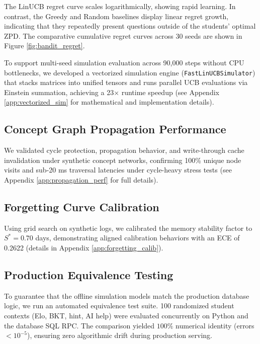 \documentclass{article}
\begin{document}
The LinUCB regret curve scales logarithmically, showing rapid learning. In contrast, the Greedy and Random baselines display linear regret growth, indicating that they repeatedly present questions outside of the students' optimal ZPD. The comparative cumulative regret curves across 30 seeds are shown in Figure \ref{fig:bandit_regret}.




To support multi-seed simulation evaluation across 90,000 steps without CPU bottlenecks, we developed a vectorized simulation engine (\texttt{FastLinUCBSimulator}) that stacks matrices into unified tensors and runs parallel UCB evaluations via Einstein summation, achieving a 23$\times$ runtime speedup (see Appendix \ref{app:vectorized_sim} for mathematical and implementation details).


\subsection{Concept Graph Propagation Performance}
We validated cycle protection, propagation behavior, and write-through cache invalidation under synthetic concept networks, confirming 100\% unique node visits and sub-20 ms traversal latencies under cycle-heavy stress tests (see Appendix \ref{app:propagation_perf} for full details).

\subsection{Forgetting Curve Calibration}
Using grid search on synthetic logs, we calibrated the memory stability factor to $S^* = 0.70$ days, demonstrating aligned calibration behaviors with an ECE of 0.2622 (details in Appendix \ref{app:forgetting_calib}).

\subsection{Production Equivalence Testing}
To guarantee that the offline simulation models match the production database logic, we run an automated equivalence test suite. 100 randomized student contexts (Elo, BKT, hint, AI help) were evaluated concurrently on Python and the database SQL RPC. The comparison yielded $100\%$ numerical identity (errors $< 10^{-5}$), ensuring zero algorithmic drift during production serving.
\end{document}

